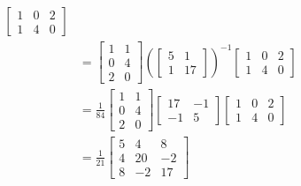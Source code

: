 \documentclass[a4paper, 12pt]{article}
\begin{document}
\begin{solution}
\begin{align*}
        \begin{bmatrix}
            1 & 0 & 2 \\
            1 & 4 & 0
        \end{bmatrix}  \\
             & =\begin{bmatrix}
                1 & 1 \\
                0 & 4 \\
                2 & 0
            \end{bmatrix}
            \left(
                \begin{bmatrix}
                5 & 1 \\
                1 & 17
                \end{bmatrix}
            \right)^{-1}
            \begin{bmatrix}
                1 & 0 & 2 \\
                1 & 4 & 0
            \end{bmatrix}  \\
            &= \frac{1}{84}\begin{bmatrix}
                1 & 1 \\
                0 & 4 \\
                2 & 0
            \end{bmatrix}
            \begin{bmatrix}
                17 & -1 \\
                -1 & 5
            \end{bmatrix}
            \begin{bmatrix}
                1 & 0 & 2 \\
                1 & 4 & 0
            \end{bmatrix} \\
            &= \frac{1}{21}\begin{bmatrix}
            5 & 4 & 8 \\
            4 & 20 & -2 \\
            8 & -2 & 17
            \end{bmatrix}
    \end{align*}


\end{solution}
\end{document}
